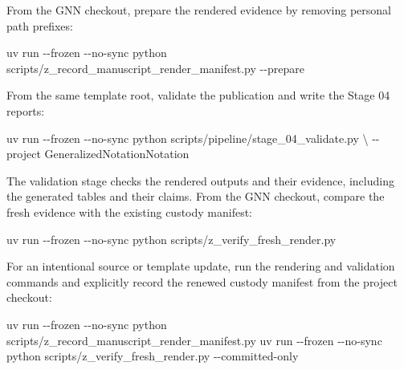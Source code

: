 \documentclass[
  english,
  9pt,
]{extarticle}
\newenvironment{Shaded}{}{}
\newcommand{\AttributeTok}[1]{\textcolor[rgb]{0.49,0.56,0.16}{#1}}
\newcommand{\DataTypeTok}[1]{\textcolor[rgb]{0.56,0.13,0.00}{#1}}
\newcommand{\ExtensionTok}[1]{#1}
\newcommand{\NormalTok}[1]{#1}
\begin{document}
From the GNN checkout, prepare the rendered evidence by removing
personal path prefixes:

\begin{Shaded}
\begin{Highlighting}[]
\ExtensionTok{uv}\NormalTok{ run }\AttributeTok{{-}{-}frozen} \AttributeTok{{-}{-}no{-}sync}\NormalTok{ python scripts/z\_record\_manuscript\_render\_manifest.py }\AttributeTok{{-}{-}prepare}
\end{Highlighting}
\end{Shaded}

From the same template root, validate the publication and write the
Stage 04 reports:

\begin{Shaded}
\begin{Highlighting}[]
\ExtensionTok{uv}\NormalTok{ run }\AttributeTok{{-}{-}frozen} \AttributeTok{{-}{-}no{-}sync}\NormalTok{ python scripts/pipeline/stage\_04\_validate.py }\DataTypeTok{\textbackslash{}}
  \AttributeTok{{-}{-}project}\NormalTok{ GeneralizedNotationNotation}
\end{Highlighting}
\end{Shaded}

The validation stage checks the rendered outputs and their evidence,
including the generated tables and their claims. From the GNN checkout,
compare the fresh evidence with the existing custody manifest:

\begin{Shaded}
\begin{Highlighting}[]
\ExtensionTok{uv}\NormalTok{ run }\AttributeTok{{-}{-}frozen} \AttributeTok{{-}{-}no{-}sync}\NormalTok{ python scripts/z\_verify\_fresh\_render.py}
\end{Highlighting}
\end{Shaded}

For an intentional source or template update, run the rendering and
validation commands and explicitly record the renewed custody manifest
from the project checkout:

\begin{Shaded}
\begin{Highlighting}[]
\ExtensionTok{uv}\NormalTok{ run }\AttributeTok{{-}{-}frozen} \AttributeTok{{-}{-}no{-}sync}\NormalTok{ python scripts/z\_record\_manuscript\_render\_manifest.py}
\ExtensionTok{uv}\NormalTok{ run }\AttributeTok{{-}{-}frozen} \AttributeTok{{-}{-}no{-}sync}\NormalTok{ python scripts/z\_verify\_fresh\_render.py }\AttributeTok{{-}{-}committed{-}only}
\end{Highlighting}
\end{Shaded}
\end{document}
